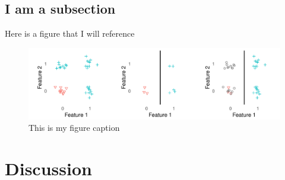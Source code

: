 \documentclass[
]{article}
\begin{document}
\hypertarget{i-am-a-subsection}{%
\subsection{I am a subsection}\label{i-am-a-subsection}}

Here is a figure that I will reference

\begin{figure}
\centering
\includegraphics{figures/learning_trap.pdf}
\caption{This is my figure caption\label{fig:learning_trap}}
\end{figure}

\hypertarget{discussion}{%
\section{Discussion}\label{discussion}}

\renewcommand\refname{References}
  
\end{document}
